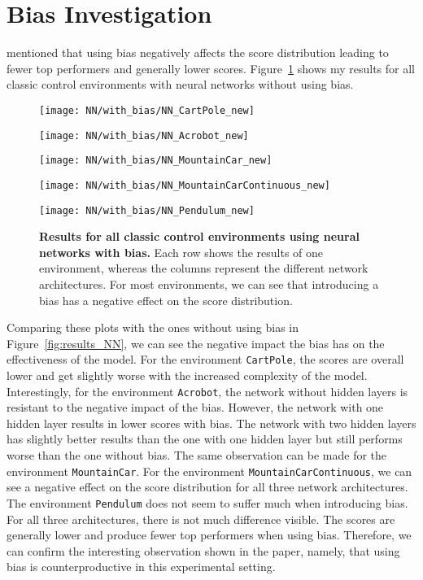 \section{Bias Investigation}
\cite{oller_analyzing_2020} mentioned that using bias negatively affects the score distribution leading to fewer top performers and generally lower scores. Figure~\ref{fig:results_NN_bias} shows my results for all classic control environments with neural networks without using bias.
\begin{figure}
  \centering
  \texttt{[image: NN/with\_bias/NN\_CartPole\_new]}

  \vspace{0.2cm}

  \texttt{[image: NN/with\_bias/NN\_Acrobot\_new]}

  \vspace{0.2cm}

  \texttt{[image: NN/with\_bias/NN\_MountainCar\_new]}

  \vspace{0.2cm}

  \texttt{[image: NN/with\_bias/NN\_MountainCarContinuous\_new]}

  \vspace{0.2cm}

  \texttt{[image: NN/with\_bias/NN\_Pendulum\_new]}
\caption[Results for all classic control environments using neural networks with bias]{
  \textbf{Results for all classic control environments using neural networks with bias.}
   Each row shows the results of one environment, whereas the columns represent the different network architectures. For most environments, we can see that introducing a bias has a negative effect on the score distribution.
}
\label{fig:results_NN_bias}
\end{figure}
Comparing these plots with the ones without using bias in Figure~\ref{fig:results_NN}, we can see the negative impact the bias has on the effectiveness of the model. For the environment \verb|CartPole|, the scores are overall lower and get slightly worse with the increased complexity of the model. Interestingly, for the environment \verb|Acrobot|, the network without hidden layers is resistant to the negative impact of the bias. However, the network with one hidden layer results in lower scores with bias. The network with two hidden layers has slightly better results than the one with one hidden layer but still performs worse than the one without bias. The same observation can be made for the environment \verb|MountainCar|. For the environment \verb|MountainCarContinuous|, we can see a negative effect on the score distribution for all three network architectures. The environment \verb|Pendulum| does not seem to suffer much when introducing bias. For all three architectures, there is not much difference visible. The scores are generally lower and produce fewer top performers when using bias. Therefore, we can confirm the interesting observation shown in the paper, namely, that using bias is counterproductive in this experimental setting.


